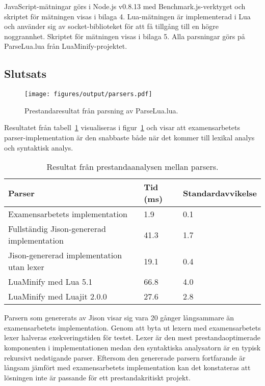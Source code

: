 JavaScript-mätningar görs i Node.js v0.8.13 med Benchmark.js-verktyget och
skriptet för mätningen visas i bilaga 4. Lua-mätningen är implementerad i Lua
och använder sig av socket-biblioteket för att få tillgång till en högre
noggrannhet. Skriptet för mätningen visas i bilaga 5. Alla parsningar görs på
ParseLua.lua från LuaMinify-projektet.

\subsection{Slutsats}

\begin{figure}[ht]
  \texttt{[image: figures/output/parsers.pdf]}
  \caption{Prestandaresultat från parsning av ParseLua.lua.}
  \label{fig:parserresult}
\end{figure}

Resultatet från tabell~\ref{tab:parsers} visualiseras i
figur~\ref{fig:parserresult} och visar att examensarbetets
parser-implementation är den snabbaste både när det kommer till lexikal analys
och syntaktisk analys.

\begin{table}[ht]
  \caption{Resultat från prestandaanalysen mellan parsers.}
  \begin{tabular}{l l l}
    Parser & Tid (ms) & Standardavvikelse \\
    \hline
    Examensarbetets implementation & 1.9 & 0.1 \\
    Fullständig Jison-genererad implementation & 41.3 & 1.7 \\
    Jison-genererad implementation utan lexer & 19.1 & 0.4 \\
    LuaMinify med Lua 5.1 & 66.8 & 4.0 \\
    LuaMinify med Luajit 2.0.0 & 27.6 & 2.8
  \end{tabular}
  \label{tab:parsers}
\end{table}


Parsern som genererats av Jison visar sig vara 20 gånger långsammare än
examensarbetets implementation.  Genom att byta ut lexern med examensarbetets
lexer halveras exekveringstiden för testet. Lexer är den mest
prestandaoptimerade komponenten i implementationen medan den syntaktiska
analysatorn är en typisk rekursivt nedstigande parser. Eftersom den
genererade parsern fortfarande är långsam jämfört med examensarbetets
implementation kan det konstateras att lösningen inte är passande för ett
prestandakritiskt projekt.

